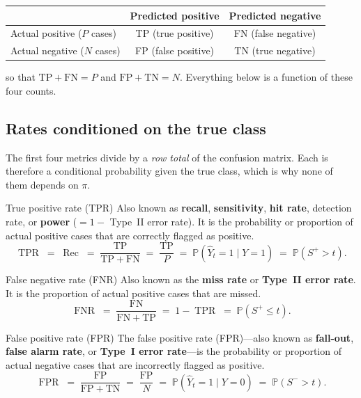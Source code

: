 \documentclass[11pt,a4paper]{article}
\newcommand{\Prob}{\mathbb{P}}
\DeclareMathOperator{\TPR}{TPR}
\DeclareMathOperator{\FPR}{FPR}
\DeclareMathOperator{\FNR}{FNR}
\DeclareMathOperator{\Rec}{Rec}
\theoremstyle{plain}
\theoremstyle{definition}
\theoremstyle{remark}
\begin{document}
\begin{center}
\begin{tabular}{lcc}
\toprule
 & Predicted positive & Predicted negative \\
\midrule
Actual positive ($P$ cases) & TP (true positive)  & FN (false negative) \\
Actual negative ($N$ cases) & FP (false positive) & TN (true negative)  \\
\bottomrule
\end{tabular}
\end{center}
so that $\mathrm{TP}+\mathrm{FN}=P$ and $\mathrm{FP}+\mathrm{TN}=N$. Everything below is a function of
these four counts.

\subsection{Rates conditioned on the true class}
The first four metrics divide by a \emph{row total} of the confusion matrix. Each is therefore a
conditional probability given the true class, which is why none of them depends on $\pi$.

\begin{metric}{True positive rate (TPR)}
Also known as \textbf{recall}, \textbf{sensitivity}, \textbf{hit rate}, detection rate, or
\textbf{power} ($=1-$ Type~II error rate). It is the probability or proportion of actual positive cases
that are correctly flagged as positive.
\[
  \TPR \;=\; \Rec \;=\; \frac{\mathrm{TP}}{\mathrm{TP}+\mathrm{FN}} \;=\; \frac{\mathrm{TP}}{P}
  \;=\; \Prob(\hat Y_t=1\mid Y=1) \;=\; \Prob(S^{+}>t).
\]
\end{metric}

\begin{metric}{False negative rate (FNR)}
Also known as the \textbf{miss rate} or \textbf{Type~II error rate}. It is the proportion of actual
positive cases that are missed.
\[
  \FNR \;=\; \frac{\mathrm{FN}}{\mathrm{FN}+\mathrm{TP}} \;=\; 1-\TPR \;=\; \Prob(S^{+}\le t).
\]
\end{metric}

\begin{metric}{False positive rate (FPR)}
The false positive rate (FPR)---also known as \textbf{fall-out}, \textbf{false alarm rate}, or
\textbf{Type~I error rate}---is the probability or proportion of actual negative cases that are
incorrectly flagged as positive.
\[
  \FPR \;=\; \frac{\mathrm{FP}}{\mathrm{FP}+\mathrm{TN}} \;=\; \frac{\mathrm{FP}}{N}
  \;=\; \Prob(\hat Y_t=1\mid Y=0) \;=\; \Prob(S^{-}>t).
\]
\end{metric}
\end{document}
